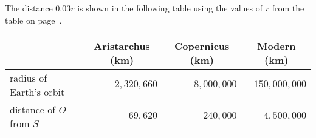The distance $0.03r$ is shown in the following table using the values of $r$ from the table on page~\pageref{p.table1}.

\begin{center}
\begin{tabular}{|l|r|r|r|}
\hline
&\multicolumn{1}{|c|}{Aristarchus (km)}&
\multicolumn{1}{|c|}{Copernicus (km)} & \multicolumn{1}{|c|}{Modern (km)}\\
\hline\hline
radius of Earth's orbit & $2,320,660$ & $8,000,000$ & $150,000,000$\\\hline
distance of $O$ from $S$ & $69,620$ & $240,000$ & $4,500,000$ \\
\hline
\end{tabular}
\end{center}
